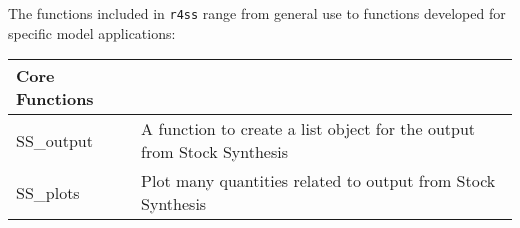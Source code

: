 The functions included in \texttt{r4ss} range from general use to functions developed for specific model applications:
\begin{center}
	\begin{longtable}{p{4.5cm} p{10.52cm}}
		\hline
		Core Functions & \Tstrut\Bstrut\\
		\hline
		SS\_output \Tstrut& A function to create a list object for the output from Stock Synthesis\\
		SS\_plots  \Tstrut& Plot many quantities related to output from Stock Synthesis\\
		\hline
		
	

\end{longtable}
\end{center}
